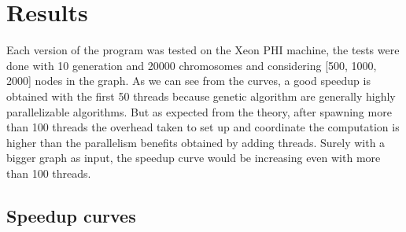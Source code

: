 \section{Results}
Each version of the program was tested on the Xeon PHI machine, the tests were done with 10 generation and 20000 chromosomes and considering [500, 1000, 2000] nodes in the graph. As we can see from the curves, a good speedup is obtained with the first 50 threads because genetic algorithm are generally highly parallelizable algorithms. But as expected from the theory, after spawning more than 100 threads the overhead taken to set up and coordinate the computation is higher than the parallelism benefits obtained by adding threads. Surely with a bigger graph as input, the speedup curve would be increasing even with more than 100 threads. 

\subsection{Speedup curves}
